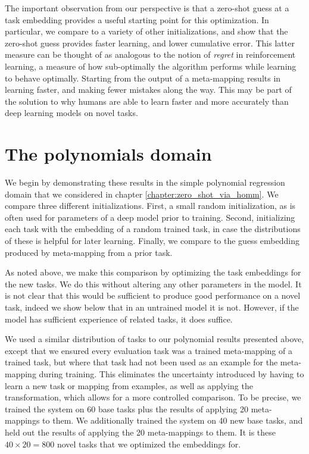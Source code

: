 The important observation from our perspective is that a zero-shot guess at a task embedding provides a useful starting point for this optimization. In particular, we compare to a variety of other initializations, and show that the zero-shot guess provides faster learning, and lower cumulative error. This latter measure can be thought of as analogous to the notion of \emph{regret} in reinforcement learning, a measure of how sub-optimally the algorithm performs while learning to behave optimally. Starting from the output of a meta-mapping results in learning faster, and making fewer mistakes along the way. This may be part of the solution to why humans are able to learn faster and more accurately than deep learning models on novel tasks. \par   

\section{The polynomials domain}

We begin by demonstrating these results in the simple polynomial regression domain that we considered in chapter \ref{chapter:zero_shot_via_homm}. We compare three different initializations. First, a small random initialization, as is often used for parameters of a deep model prior to training. Second, initializing each task with the embedding of a random trained task, in case the distributions of these is helpful for later learning. Finally, we compare to the guess embedding produced by meta-mapping from a prior task. \par 
As noted above, we make this comparison by optimizing the task embeddings for the new tasks. We do this without altering any other parameters in the model. It is not clear that this would be sufficient to produce good performance on a novel task, indeed we show below that in an untrained model it is not. However, if the model has sufficient experience of related tasks, it does suffice. \par 
We used a similar distribution of tasks to our polynomial results presented above, except that we ensured every evaluation task was a trained meta-mapping of a trained task, but where that task had not been used as an example for the meta-mapping during training. This eliminates the uncertainty introduced by having to learn a new task or mapping from examples, as well as applying the transformation, which allows for a more controlled comparison. To be precise, we trained the system on 60 base tasks plus the results of applying 20 meta-mappings to them. We additionally trained the system on 40 new base tasks, and held out the results of applying the 20 meta-mappings to them. It is these \(40 \times 20 = 800\) novel tasks that we optimized the embeddings for. \par 

